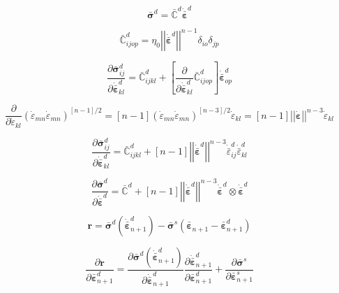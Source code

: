 \documentclass[12pt]{article}
\newcommand{\pder}[2]{\dfrac{\partial #1}{\partial #2}}
\begin{document}
\begin{equation}
	\bar{\bm{\sigma}}^{d} = \bar{\mathbb{C}}^{d}\dot{\bar{\bm{\varepsilon}}}^{d}
\end{equation}

\begin{equation}
	 \bar{\mathbb{C}}^{d}_{ijop} = \eta_{0} \left|\left|\dot{\bar{\bm{\varepsilon}}}^{d}\right|\right|^{n-1} \delta_{io}\delta_{jp}
\end{equation}

\begin{equation}
	\pder{\bar{\bm{\sigma}}^{d}_{ij}}{\dot{\bar{\bm{\varepsilon}}}_{kl}^{d}} = \bar{\mathbb{C}}^{d}_{ijkl} + \left[\pder{ }{\dot{\bar{\bm{\varepsilon}}}_{kl}^{d}} \bar{\mathbb{C}}^{d}_{ijop}\right]\dot{\bar{\bm{\varepsilon}}}_{op}^{d}
\end{equation}

\begin{equation}
	\pder{ }{\dot{\varepsilon}_{kl}}\left(\dot{\varepsilon}_{mn}\dot{\varepsilon}_{mn}\right)^{\left[n-1\right]/2} = \left[n-1\right]\left(\dot{\varepsilon}_{mn}\dot{\varepsilon}_{mn}\right)^{\left[n-3\right]/2}\dot{\varepsilon}_{kl} = \left[n-1\right]\left|\left|\dot{\bm{\varepsilon}}\right |\right|^{n-3}\dot{\varepsilon}_{kl}
\end{equation}

\begin{equation}
		\pder{\bar{\bm{\sigma}}^{d}_{ij}}{\dot{\bar{\bm{\varepsilon}}}_{kl}^{d}} = \bar{\mathbb{C}}^{d}_{ijkl} +\left[n-1\right]\left|\left|\dot{\bar{\bm{\varepsilon}}}^{d}\right |\right|^{n-3}\dot{\bar{\varepsilon}}^{d}_{ij}\dot{\bar{\varepsilon}}^{d}_{kl}
\end{equation}


\begin{equation}
\pder{\bar{\bm{\sigma}}^{d}}{\dot{\bar{\bm{\varepsilon}}}^{d}} = \bar{\mathbb{C}}^{d} +\left[n-1\right]\left|\left|\dot{\bar{\bm{\varepsilon}}}^{d}\right |\right|^{n-3}\dot{\bar{\bm{\varepsilon}}}^{d}\otimes\dot{\bar{\bm{\varepsilon}}}^{d}
\end{equation}

\begin{equation}
	\bm{r} = \bar{\bm{\sigma}}^{d}\left(\dot{\bar{\bm{\varepsilon}}}_{n+1}^{d}\right) - \bar{\bm{\sigma}}^{s}(\bar{\bm{\varepsilon}}_{n+1} - \bar{\bm{\varepsilon}}_{n+1}^{d})  
\end{equation}

\begin{equation}
	\pder{\bm{r}}{\bar{\bm{\varepsilon}}_{n+1}^{d}} = \pder{\bar{\bm{\sigma}}^{d}\left(\dot{\bar{\bm{\varepsilon}}}_{n+1}^{d}\right)}{\dot{\bar{\bm{\varepsilon}}}_{n+1}^{d}}\pder{\dot{\bar{\bm{\varepsilon}}}_{n+1}^{d}}{\bar{\bm{\varepsilon}}_{n+1}^{d}} + \pder{\bar{\bm{\sigma}}^{s}}{\bar{\bm{\varepsilon}}_{n+1}^{s}}
\end{equation}
\end{document}
